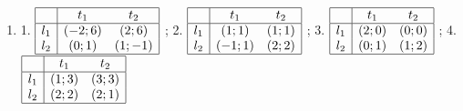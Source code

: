 \begin{problem}
\begin{enumerate}
\item 	1.  $\begin{array}{|c|cc|}  \hline {} & {t_{1} } & {t_{2} } \\  \hline {l_{1} } & {\left(-2;6\right)} & {\left(2;6\right)} \\ {l_{2} } & {\left(0;1\right)} & {\left(1;-1\right)} \\  \hline  \end{array}$ ; 2.  $\begin{array}{|c|cc|}  \hline {} & {t_{1} } & {t_{2} } \\  \hline {l_{1} } & {\left(1;1\right)} & {\left(1;1\right)} \\ {l_{2} } & {\left(-1;1\right)} & {\left(2;2\right)} \\  \hline  \end{array}$ ; 3.  $\begin{array}{|c|cc|}  \hline {} & {t_{1} } & {t_{2} } \\  \hline {l_{1} } & {\left(2;0\right)} & {\left(0;0\right)} \\ {l_{2} } & {\left(0;1\right)} & {\left(1;2\right)} \\  \hline  \end{array}$ ; 4.  $\begin{array}{|c|cc|}  \hline {} & {t_{1} } & {t_{2} } \\  \hline {l_{1} } & {\left(1;3\right)} & {\left(3;3\right)} \\ {l_{2} } & {\left(2;2\right)} & {\left(2;1\right)} \\  \hline  \end{array}$ \\

\end{enumerate}
\end{problem}
